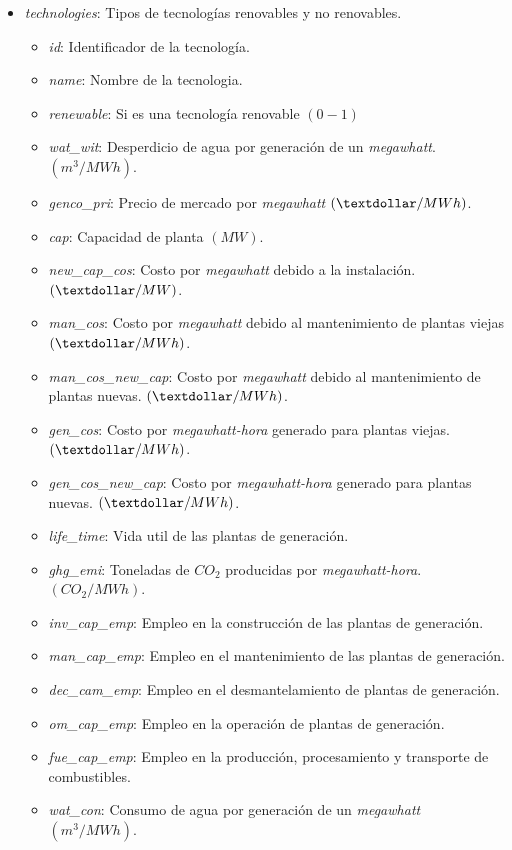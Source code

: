 \begin{itemize}
	\item \textit{technologies}: Tipos de tecnologías renovables y no renovables.
	\begin{itemize}
		\item \textit{id}: Identificador de la tecnología.		
		\item \textit{name}: Nombre de la tecnologia.
		\item \textit{renewable}: Si es una tecnología renovable $ (0 - 1) $
		\item \textit{wat\_wit}: Desperdicio de agua por generación de un \textit{megawhatt}. $ (m^{3}/MWh) $.
		\item \textit{genco\_pri}: Precio de mercado por \textit{megawhatt} $ (\textdollar/MWh) $.
		\item \textit{cap}: Capacidad de planta $ (MW) $.
		\item \textit{new\_cap\_cos}: Costo por \textit{megawhatt} debido a la instalación. $ (\textdollar/MW) $.
		\item \textit{man\_cos}: Costo por \textit{megawhatt} debido al mantenimiento de plantas viejas $ (\textdollar/MWh) $.
		\item \textit{man\_cos\_new\_cap}: Costo por \textit{megawhatt} debido al mantenimiento de plantas nuevas. $ (\textdollar/MWh) $.
		\item \textit{gen\_cos}: Costo por \textit{megawhatt-hora} generado para plantas viejas. $ (\textdollar/MWh) $.
		\item \textit{gen\_cos\_new\_cap}: Costo por \textit{megawhatt-hora} generado para plantas nuevas. $ (\textdollar/MWh) $.
		\item \textit{life\_time}: Vida util de las plantas de generación.
		\item \textit{ghg\_emi}: Toneladas de $CO_{2}$ producidas por \textit{megawhatt-hora}. $(CO_{2}/MWh)$.
		\item \textit{inv\_cap\_emp}: Empleo en la construcción de las plantas de generación.
		\item \textit{man\_cap\_emp}: Empleo en el mantenimiento de las plantas de generación.
		\item \textit{dec\_cam\_emp}: Empleo en el desmantelamiento de plantas de generación.
		\item \textit{om\_cap\_emp}: Empleo en la operación de plantas de generación.
		\item \textit{fue\_cap\_emp}: Empleo en la producción, procesamiento y transporte de combustibles.
		\item \textit{wat\_con}: Consumo de agua por generación de un \textit{megawhatt} $ (m^{3}/MWh) $.
	\end{itemize}


\end{itemize}
